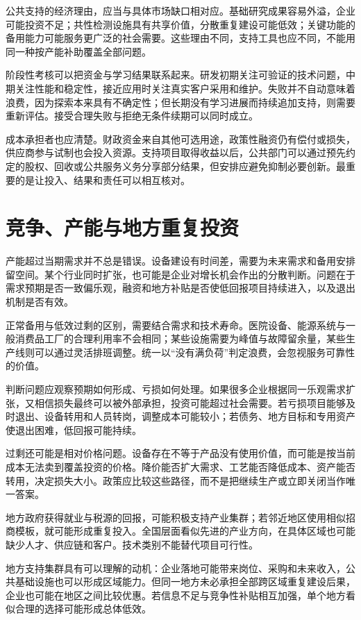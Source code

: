 \documentclass[UTF8,fontset=fandol,zihao=-4,oneside,openany]{ctexbook}
\begin{document}
\label{arg:P213}
公共支持的经济理由，应当与具体市场缺口相对应。基础研究成果容易外溢，企业可能投资不足；共性检测设施具有共享价值，分散重复建设可能低效；关键功能的备用能力可能服务更广泛的社会需要。这些理由不同，支持工具也应不同，不能用同一种按产能补助覆盖全部问题。

阶段性考核可以把资金与学习结果联系起来。研发初期关注可验证的技术问题，中期关注性能和稳定性，接近应用时关注真实客户采用和维护。失败并不自动意味着浪费，因为探索本来具有不确定性；但长期没有学习进展而持续追加支持，则需要重新评估。接受合理失败与拒绝无条件续期可以同时成立。

成本承担者也应清楚。财政资金来自其他可选用途，政策性融资仍有偿付或损失，供应商参与试制也会投入资源。支持项目取得收益以后，公共部门可以通过预先约定的股权、回收或公共服务义务分享部分结果，但安排应避免抑制必要创新。最重要的是让投入、结果和责任可以相互核对。

\section{竞争、产能与地方重复投资}
产能超过当期需求并不总是错误。设备建设有时间差，需要为未来需求和备用安排留空间。某个行业同时扩张，也可能是企业对增长机会作出的分散判断。问题在于需求预期是否一致偏乐观，融资和地方补贴是否使低回报项目持续进入，以及退出机制是否有效。

\label{arg:P214}
正常备用与低效过剩的区别，需要结合需求和技术寿命。医院设备、能源系统与一般消费品工厂的合理利用率不会相同；某些设施需要为峰值与故障留余量，某些生产线则可以通过灵活排班调整。统一以“没有满负荷”判定浪费，会忽视服务可靠性的价值。

判断问题应观察预期如何形成、亏损如何处理。如果很多企业根据同一乐观需求扩张，又相信损失最终可以被外部承担，投资可能超过社会需要。若亏损项目能够及时退出、设备转用和人员转岗，调整成本可能较小；若债务、地方目标和专用资产使退出困难，低回报可能持续。

过剩还可能是相对价格问题。设备存在不等于产品没有使用价值，而可能是按当前成本无法卖到覆盖投资的价格。降价能否扩大需求、工艺能否降低成本、资产能否转用，决定损失大小。政策应比较这些路径，而不是把继续生产或立即关闭当作唯一答案。

地方政府获得就业与税源的回报，可能积极支持产业集群；若邻近地区使用相似招商模板，就可能形成重复投入。全国层面看似先进的产业方向，在具体区域也可能缺少人才、供应链和客户。技术类别不能替代项目可行性。

\label{arg:P215}
地方支持集群具有可以理解的动机：企业落地可能带来岗位、采购和未来收入，公共基础设施也可以形成区域能力。但同一地方未必承担全部跨区域重复建设后果，企业也可能在地区之间比较优惠。若信息不足与竞争性补贴相互加强，单个地方看似合理的选择可能形成总体低效。
\end{document}
